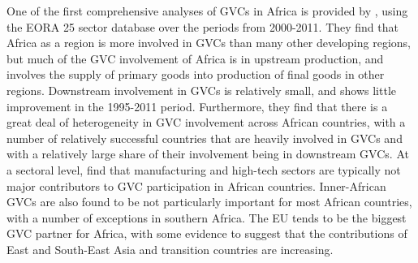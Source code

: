 \documentclass[a4paper]{article}
\begin{document}
One of the first comprehensive analyses of GVCs in Africa is provided by \citet{foster2015global}, using the EORA 25 sector database over the periods from 2000-2011. %
They find that Africa as a region is more involved in GVCs than many other developing regions, but much of the GVC involvement of Africa is in upstream production, and involves the supply of primary goods into production of final goods in other regions. Downstream involvement in GVCs is relatively small, and shows little improvement in the 1995-2011 period. Furthermore, they find that there is a great deal of heterogeneity in GVC involvement across African countries, with a number of relatively successful countries that are heavily involved in GVCs and with a relatively large share of their involvement being in downstream GVCs. At a sectoral level, \citet{foster2015global} find that manufacturing and high-tech sectors are typically not major contributors to GVC participation in African countries. %
Inner-African GVCs are also found to be not particularly important for most African countries, with a number of exceptions in southern Africa. The EU tends to be the biggest GVC partner for Africa, with some evidence to suggest that the contributions of East and South-East Asia and transition countries are increasing. \newline


\end{document}
